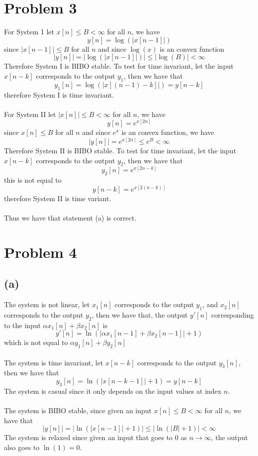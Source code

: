 \section*{Problem 3}
For System 1 let $x[n]\leq B <\infty$ for all $n$, we have
$$y[n]=\log(|x[n-1]|)$$
since $|x[n-1]|\leq B$ for all $n$ and since $\log(x)$ is an convex function
$$|y[n]|=|\log(|x[n-1]|)|\leq |\log(B)|<\infty$$
Therefore System I is BIBO stable. To test for time invariant, let 
the input $x[n-k]$ corresponds to the output $y_1$, then we have that
$$y_1[n]=\log(|x[(n-1)-k]|)=y[n-k]$$
therefore System I is time invariant.\\\\
For System II let $|x[n]|\leq B <\infty$ for all $n$, we have
$$y[n]=e^{x[2n]}$$
since $x[n]\leq B$ for all $n$ and since $e^x$ is an convex function, we have
$$|y[n]|=e^{x[2n]}\leq e^B<\infty$$
Therefore System II is BIBO stable. To test for time invariant, let
the input $x[n-k]$ corresponds to the output $y_2$, then we have that
$$y_2[n]=e^{x[2n-k]}$$
this is not equal to 
$$y[n-k]=e^{x[2(n-k)]}$$
therefore System II is time variant.\\\\
Thus we have that statement (a) is correct.
\section*{Problem 4}
\subsection*{(a)}
The system is not linear, let 
$x_1[n]$ corresponds to the output $y_1$, and $x_2[n]$ corresponds to the output $y_2$, then we have that, 
the output $y'[n]$ corresponding to the input $\alpha x_1[n]+\beta x_2[n]$ is
$$y'[n]=\ln(|\alpha x_1[n-1]+\beta x_2[n-1]|+1)$$
which is not equal to $\alpha y_1[n]+\beta y_2[n]$\\\\
The system is time invariant, let $x[n-k]$ corresponds to the output $y_3[n]$, then we have that
$$y_3[n]=\ln(|x[n-k-1]|+1)=y[n-k]$$
The system is casual since it only depends on the input values at index $n$.\\\\
The system is BIBO stable, since given an input $x[n]\leq B<\infty$ for all $n$, we have that
$$|y[n]|=|\ln(|x[n-1]|+1)|\leq |\ln(|B|+1)|<\infty$$
The system is relaxed since given an input that goes to $0$ as $n\to\infty$, the output
also goes to $\ln(1)=0$.
